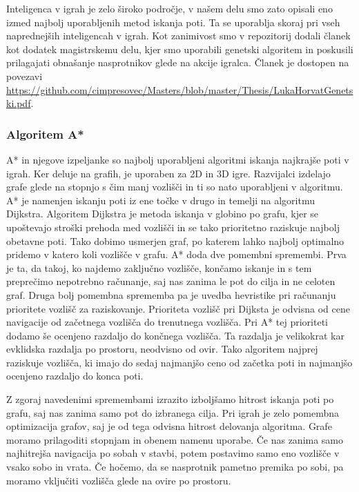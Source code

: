 \documentclass[12pt,a4paper,twoside]{book}
\begin{document}
Inteligenca v igrah je zelo široko področje, v našem delu smo zato opisali eno izmed najbolj uporabljenih metod iskanja poti. Ta se uporablja skoraj pri vseh naprednejših inteligencah v igrah. Kot zanimivost smo v repozitorij dodali članek kot dodatek magistrskemu delu, kjer smo uporabili genetski algoritem in poskusili prilagajati obnašanje nasprotnikov glede na akcije igralca. Članek je dostopen na povezavi \url{https://github.com/cimpresovec/Masters/blob/master/Thesis/LukaHorvatGenetski.pdf}.

\subsubsection{Algoritem A*}

A* in njegove izpeljanke so najbolj uporabljeni algoritmi iskanja najkrajše poti v igrah. Ker deluje na grafih, je uporaben za 2D in 3D igre. Razvijalci izdelajo grafe glede na stopnjo s čim manj vozlišči in ti so nato uporabljeni v algoritmu. A* je namenjen iskanju poti iz ene točke v drugo in temelji na algoritmu Dijkstra. Algoritem Dijkstra je metoda iskanja v globino po grafu, kjer se upoštevajo stroški prehoda med vozlišči in se tako prioritetno raziskuje najbolj obetavne poti. Tako dobimo usmerjen graf, po katerem lahko najbolj optimalno pridemo v katero koli vozlišče v grafu. A* doda dve pomembni spremembi. Prva je ta, da takoj, ko najdemo zaključno vozlišče, končamo iskanje in s tem preprečimo nepotrebno računanje, saj nas zanima le pot do cilja in ne celoten graf. Druga bolj pomembna sprememba pa je uvedba hevristike pri računanju prioritete vozlišč za raziskovanje. Prioriteta vozlišč pri Dijksta je odvisna od cene navigacije od začetnega vozlišča do trenutnega vozlišča. Pri A* tej prioriteti dodamo še ocenjeno razdaljo do končnega vozlišča. Ta razdalja je velikokrat kar evklidska razdalja po prostoru, neodvisno od ovir. Tako algoritem najprej raziskuje vozlišča, ki imajo do sedaj najmanjšo ceno od začetka poti in najmanjšo ocenjeno razdaljo do konca poti. 

Z zgoraj navedenimi spremembami izrazito izboljšamo hitrost iskanja poti po grafu, saj nas zanima samo pot do izbranega cilja. Pri igrah je zelo pomembna optimizacija grafov, saj je od tega odvisna hitrost delovanja algoritma. Grafe moramo prilagoditi stopnjam in obenem namenu uporabe. Če nas zanima samo najhitrejša navigacija po sobah v stavbi, potem postavimo samo eno vozlišče v vsako sobo in vrata. Če hočemo, da se nasprotnik pametno premika po sobi, pa moramo vključiti vozlišča glede na ovire po prostoru.
\end{document}
